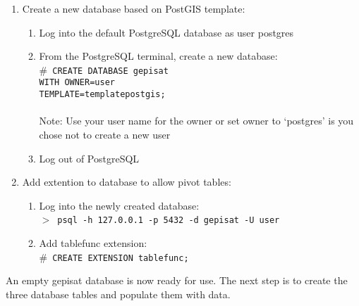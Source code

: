 \begin{enumerate}
\begin{enumerate}
\begin{enumerate}
        \end{enumerate}
    \end{enumerate}
    \item Create a new database based on PostGIS template:
    \begin{enumerate}
        \item Log into the default PostgreSQL database as user postgres
        \item From the PostgreSQL terminal, create a new database:\\
              $\#$~\texttt{CREATE DATABASE gepisat\\ 
              WITH OWNER=user\\ 
              TEMPLATE=template\textunderscore postgis;}\\
              \\
              Note: Use your user name for the owner or set owner to 
              `postgres' is you chose not to create a new user
        \item Log out of PostgreSQL
    \end{enumerate}
    \item Add extention to database to allow pivot tables:
    \begin{enumerate}
        \item Log into the newly created database:\\
              $>$~\texttt{psql -h 127.0.0.1 -p 5432 -d gepisat -U user}
        \item Add tablefunc extension:\\
              $\#$~\texttt{CREATE EXTENSION tablefunc;}
    \end{enumerate}
\end{enumerate}

An empty gepisat database is now ready for use.  
The next step is to create the three database tables and populate them with data.
